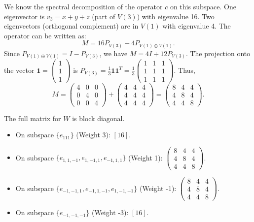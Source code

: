 \documentclass{article}
\begin{document}
We know the spectral decomposition of the operator $c$ on this subspace.
One eigenvector is $v_3 = x+y+z$ (part of $V(3)$) with eigenvalue 16.
Two eigenvectors (orthogonal complement) are in $V(1)$ with eigenvalue 4.
The operator can be written as:
\[ M = 16 P_{V(3)} + 4 P_{V(1)\oplus V(1)}. \]
Since $P_{V(1)\oplus V(1)} = I - P_{V(3)}$, we have $M = 4I + 12 P_{V(3)}$.
The projection onto the vector $\mathbf{1} = \begin{pmatrix} 1 \\ 1 \\ 1 \end{pmatrix}$ is $P_{V(3)} = \frac{1}{3} \mathbf{1}\mathbf{1}^T = \frac{1}{3} \begin{pmatrix} 1 & 1 & 1 \\ 1 & 1 & 1 \\ 1 & 1 & 1 \end{pmatrix}$.
Thus,
\[ M = \begin{pmatrix} 4 & 0 & 0 \\ 0 & 4 & 0 \\ 0 & 0 & 4 \end{pmatrix} + \begin{pmatrix} 4 & 4 & 4 \\ 4 & 4 & 4 \\ 4 & 4 & 4 \end{pmatrix} = \begin{pmatrix} 8 & 4 & 4 \\ 4 & 8 & 4 \\ 4 & 4 & 8 \end{pmatrix}. \]

The full matrix for $W$ is block diagonal.
\begin{itemize}
    \item On subspace $\{e_{111}\}$ (Weight 3): $[16]$.
    \item On subspace $\{e_{1,1,-1}, e_{1,-1,1}, e_{-1,1,1}\}$ (Weight 1): $\begin{pmatrix} 8 & 4 & 4 \\ 4 & 8 & 4 \\ 4 & 4 & 8 \end{pmatrix}$.
    \item On subspace $\{e_{-1,-1,1}, e_{-1,1,-1}, e_{1,-1,-1}\}$ (Weight -1): $\begin{pmatrix} 8 & 4 & 4 \\ 4 & 8 & 4 \\ 4 & 4 & 8 \end{pmatrix}$.
    \item On subspace $\{e_{-1,-1,-1}\}$ (Weight -3): $[16]$.
\end{itemize}
\end{document}
